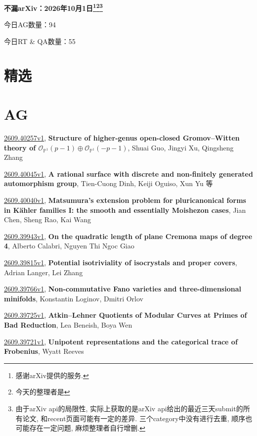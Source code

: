 \documentclass[9pt, a4paper]{article}
\theoremstyle{plain}
\theoremstyle{definition}
\theoremstyle{remark}
\newcommand{\arxiv}[3]{\href{https://arxiv.org/abs/#1}{#1}, \textbf{\textcolor{arxivblue}{#2}}, #3}
\newcommand{\AGnumber}{94}
\newcommand{\RTQAnumber}{55}
\newcommand{\NewestDate}{2026年10月1日}
\newcommand{\todayarXiver}{} %
\begin{document}
\begin{center}
    \Huge\textbf{不漏arXiv：\NewestDate\footnote{感谢arXiv提供的服务.}\footnote{今天的整理者是\todayarXiver}\footnote{由于arXiv api的局限性, 实际上获取的是arXiv api给出的最近三天submit的所有论文, 和recent页面可能有一定的差异. 三个category中没有进行去重, 顺序也可能存在一定问题, 麻烦整理者自行增删.}} \\
\end{center}

\setcounter{section}{-1}

\begin{center}
    今日AG数量：\AGnumber
    
    今日RT \& QA数量：\RTQAnumber
    
\end{center}


\section{精选}


\section{AG}
\arxiv{2609.40257v1}{Structure of higher-genus open-closed Gromov--Witten theory of $\mathcal{O}_{\mathbb{P}^{1}}(p-1)\oplus\mathcal{O}_{\mathbb{P}^{1}}(-p-1)$}{Shuai Guo, Jingyi Xu, Qingsheng Zhang}

\arxiv{2609.40045v1}{A rational surface with discrete and non-finitely generated automorphism group}{Tien-Cuong Dinh, Keiji Oguiso, Xun Yu 等}

\arxiv{2609.40040v1}{Matsumura's extension problem for pluricanonical forms in Kähler families I: the smooth and essentially Moishezon cases}{Jian Chen, Sheng Rao, Kai Wang}

\arxiv{2609.39943v1}{On the quadratic length of plane Cremona maps of degree 4}{Alberto Calabri, Nguyen Thi Ngoc Giao}

\arxiv{2609.39815v1}{Potential isotriviality of isocrystals and proper covers}{Adrian Langer, Lei Zhang}

\arxiv{2609.39766v1}{Non-commutative Fano varieties and three-dimensional minifolds}{Konstantin Loginov, Dmitri Orlov}

\arxiv{2609.39725v1}{Atkin--Lehner Quotients of Modular Curves at Primes of Bad Reduction}{Lea Beneish, Boya Wen}

\arxiv{2609.39721v1}{Unipotent representations and the categorical trace of Frobenius}{Wyatt Reeves}
\end{document}
